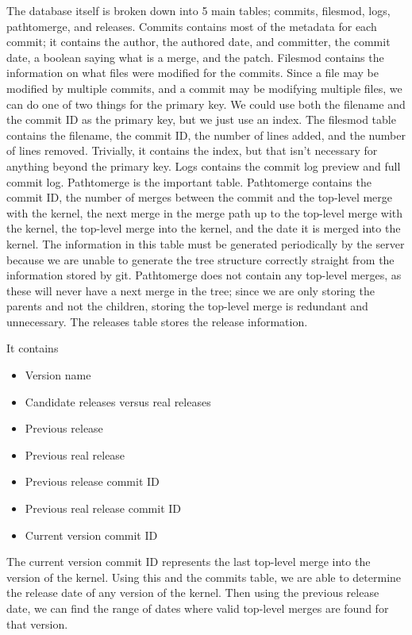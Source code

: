 \documentclass[conference, draftclsnofoot, draft]{IEEEtran}
\begin{document}
The database itself is broken down into 5 main tables; commits, filesmod, logs,
pathtomerge, and releases. Commits contains most of the metadata for each commit; it
contains the author, the authored date, and committer, the commit date, a boolean
saying what is a merge, and the patch. Filesmod contains the information on what
files were modified for the commits. Since a file may be modified by multiple
commits, and a commit may be modifying multiple files, we can do one of two things
for the primary key. We could use both the filename and the commit ID as the primary
key, but we just use an index. The filesmod table contains the filename, the commit
ID, the number of lines added, and the number of lines removed. Trivially, it
contains the index, but that isn't necessary for anything beyond the primary key.
Logs contains the commit log preview and full commit log. Pathtomerge is the
important table.  Pathtomerge contains the commit ID, the number of merges between
the commit and the top-level merge with the kernel, the next merge in the merge path
up to the top-level merge with the kernel, the top-level merge into the kernel, and
the date it is merged into the kernel. The information in this table must be
generated periodically by the server because we are unable to generate the tree
structure correctly straight from the information stored by git. Pathtomerge does
not contain any top-level merges, as these will never have a next merge in the tree;
since we are only storing the parents and not the children, storing the top-level
merge is redundant and unnecessary. The releases table stores the release
information.

It contains
\begin{itemize}
        \item Version name
        \item Candidate releases versus real releases
        \item Previous release
        \item Previous real release
        \item Previous release commit ID
        \item Previous real release commit ID
        \item Current version commit ID
\end{itemize}
The current version commit ID represents the last top-level merge into the version
of the kernel. Using this and the commits table, we are able to determine the
release date of any version of the kernel. Then using the previous release date, we
can find the range of dates where valid top-level merges are found for that version.
\end{document}
